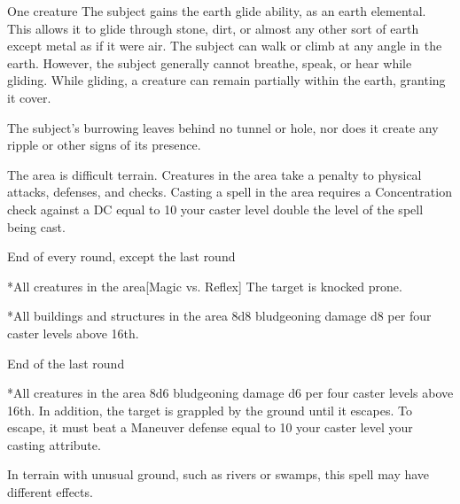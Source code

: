 \spelldur{\durshort}
\begin{spelltarget}{One creature}
    \spelleffect The subject gains the earth glide ability, as an earth elemental. This allows it to glide through stone, dirt, or almost any other sort of earth except metal  as if it were air. The subject can walk or climb at any angle in the earth. However, the subject generally cannot breathe, speak, or hear while gliding. While gliding, a creature can remain partially within the earth, granting it cover.
\end{spelltarget}
\spellnotes The subject's burrowing leaves behind no tunnel or hole, nor does it create any ripple or other signs of its presence.

\spellline
\spelleffect The area is difficult terrain. Creatures in the area take a  penalty to physical attacks, defenses, and checks. Casting a spell in the area requires a Concentration check against a DC equal to 10 \add your caster level \add double the level of the spell being cast.
\begin{spelltrigger}{End of every round, except the last round}
    \begin{spelltarget}*{All creatures in the area}[Magic vs. Reflex]
        \spellsuccess The target is knocked prone.
    \end{spelltarget}
    \begin{spelltarget}*{All buildings and structures in the area}
        \spelleffect 8d8 bludgeoning damage \add d8 per four caster levels above 16th.
    \end{spelltarget}
\end{spelltrigger}
\begin{spelltrigger}{End of the last round}
    \begin{spelltarget}*{All creatures in the area}
        \spelleffect 8d6 bludgeoning damage \add d6 per four caster levels above 16th. In addition, the target is grappled by the ground until it escapes. To escape, it must beat a Maneuver defense equal to 10 \add your caster level \add your casting attribute.
    \end{spelltarget}
\end{spelltrigger}
\spellnotes In terrain with unusual ground, such as rivers or swamps, this spell may have different effects.

